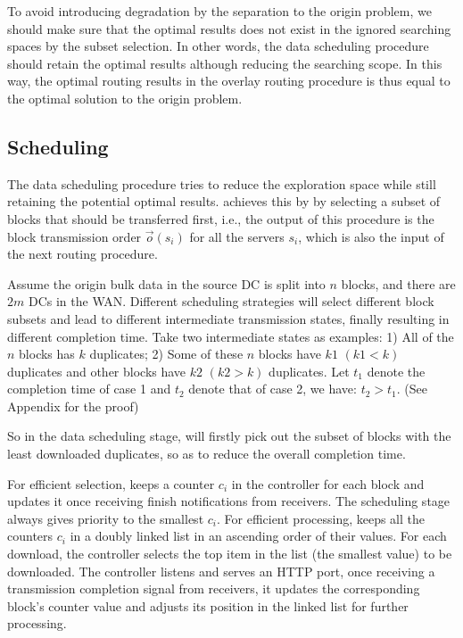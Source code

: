 To avoid introducing degradation by the separation to the origin problem, we should make sure that the optimal results does not exist in the ignored searching spaces by the subset selection. In other words, the data scheduling procedure should retain the optimal results although reducing the searching scope. In this way, the optimal routing results in the overlay routing procedure is thus equal to the optimal solution to the origin problem.

\subsection{Scheduling}
\label{subsec:logic:scheduling}

The data scheduling procedure tries to reduce the exploration space while still retaining the potential optimal results. \name achieves this by by selecting a subset of blocks that should be transferred first, i.e., the output of this procedure is the block transmission order $\overrightarrow{o}(s_i)$ for all the servers $s_i$, which is also the input of the next routing procedure.

Assume the origin bulk data in the source DC is split into $n$ blocks, and there are $2m$ DCs in the WAN. Different scheduling strategies will select different block subsets and lead to different intermediate transmission states, finally resulting in different completion time. Take two intermediate states as examples: 1) All of the $n$ blocks has $k$ duplicates; 2) Some of these $n$ blocks have $k1$ $(k1<k)$ duplicates and other blocks have $k2$ $(k2>k)$ duplicates. Let $t_1$ denote the completion time of case 1 and $t_2$ denote that of case 2, we have: $t_2 > t_1$. (See Appendix for the proof)

So in the data scheduling stage, \name will firstly pick out the subset of blocks with the least downloaded duplicates, so as to reduce the overall completion time.

For efficient selection, \name keeps a counter $c_i$ in the controller for each block and updates it once receiving finish notifications from receivers. The scheduling stage always gives priority to the smallest $c_i$. For efficient processing, \name keeps all the counters $c_i$ in a doubly linked list in an ascending order of their values. For each download, the controller selects the top item in the list (the smallest value) to be downloaded. The controller listens and serves an HTTP port, once receiving a transmission completion signal from receivers, it updates the corresponding block's counter value and adjusts its position in the linked list for further processing.


